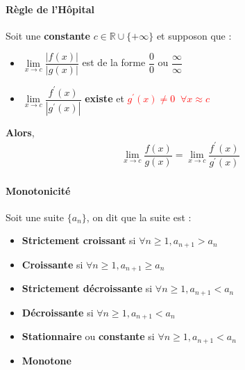 \documentclass{report}
\begin{document}
\begin{multicols*}{3}
    \paragraph{Règle de l'Hôpital}
        Soit une \textbf{constante} $c \in \mathbb{R} \cup \{+\infty\}$ et supposon que : 
        \begin{itemize}
        \item $\lim\limits_{x\to c}\dfrac{|f(x)|}{|g(x)|}$ 
            est de la forme $\dfrac{0}{0}$ ou 
            $\dfrac{\infty }{\infty }$
        \item $\lim\limits_{x\to c}\dfrac{f^{\prime}(x)}{|g^{\prime}(x)|}$
            \textbf{existe} et 
            \textcolor{red}{$g^{\prime}(x) \neq 0 \;\; \forall x \approx c$ }
        \end{itemize}
        \textbf{Alors}, 
        \begin{align*}
            \lim\limits_{x\to c}\dfrac{f(x)}{g(x)} = 
            \lim\limits_{x\to c}\dfrac{f^{\prime}(x)}{g^{\prime}(x)}
        \end{align*}
        


    \paragraph{Monotonicité} 
        Soit une suite $\{a_n \}$, on dit que la suite est :
        \begin{itemize}
            \item \textbf{Strictement croissant} si $\forall n \geq 1, 
                a_{n+1} > a_n$
            \item \textbf{Croissante} si $\forall n \geq 1, 
                a_{n+1} \geq a_n$ 
            \item \textbf{Strictement décroissante} si $\forall n \geq 1, 
                a_{n+1} < a_n$ 
            \item \textbf{Décroissante} si $\forall n \geq 1, 
                a_{n+1} < a_n$ 
            \item \textbf{Stationnaire} ou \textbf{constante} si 
                $\forall n \geq 1, 
                a_{n+1} < a_n$ 
            \item \textbf{Monotone}  
        \end{itemize} 




\end{multicols*}
\end{document}
